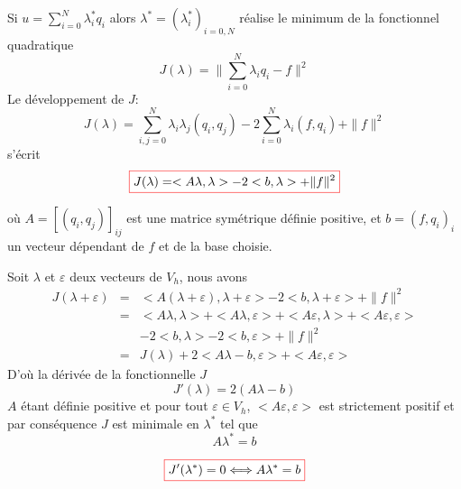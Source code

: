 \documentclass{beamer}
\newcommand{\myredbox}[1]{\fcolorbox{red}{white}{$\displaystyle#1$}}
\begin{document}
\begin{frame}
Si $u=\sum_{i=0}^N \lambda_i^* q_i$ alors $\lambda^*=(\lambda^*_i)_{i=0,N}$ réalise le minimum de la fonctionnel quadratique 
\[J(\lambda)=\|\sum_{i=0}^N \lambda_i q_i-f\|^2\]
Le développement de $J$:
\[J(\lambda)=\sum_{i,j=0}^N \lambda_i \lambda_j(q_i,q_j)-2\sum_{i=0}^N \lambda_i(f,q_i)+\|f\|^2\]
s'écrit
\[\myredbox{J(\lambda)=<A\lambda,\lambda>-2<b,\lambda>+\|f\|^2}\]

où $A=\left[(q_i,q_j)\right]_{ij}$ est une matrice symétrique définie positive, et $b=(f,q_i)_i$ un vecteur dépendant de $f$ et de la base choisie. 


\end{frame}


\begin{frame}

Soit $\lambda$ et $\varepsilon$ deux vecteurs de $V_h$, nous avons
\[ \begin{array}{ccl}
J(\lambda+\varepsilon)&=&<A(\lambda+\varepsilon),\lambda+\varepsilon> -2<b,\lambda+\varepsilon>+\|f\|^2 \\
&=&<A\lambda,\lambda>+<A\lambda,\varepsilon>+<A\varepsilon,\lambda>+<A\varepsilon,\varepsilon>\\
&&-2<b,\lambda> -2<b,\varepsilon>+\|f\|^2 \\
&=&J(\lambda)+2<A\lambda-b,\varepsilon>+<A\varepsilon,\varepsilon>
\end{array}
\]
D'où la dérivée de la fonctionnelle $J$
\[J'(\lambda)=2\left(A\lambda-b\right)\]
$A$ étant définie positive et pour tout $\varepsilon\in V_h$, $<A\varepsilon,\varepsilon>$ est strictement positif et par conséquence $J$ est minimale en $\lambda^*$ tel que 
\[ A\lambda^*=b\]

 
\[\myredbox{ J'(\lambda^*)=0 \Longleftrightarrow A\lambda^*=b}\]

\end{frame}
\end{document}

